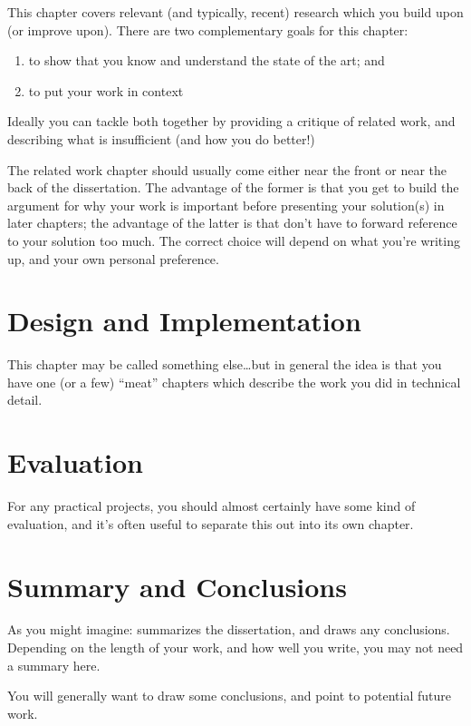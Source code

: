 \documentclass[a4paper,12pt,twoside,openright]{report}
\begin{document}
This chapter covers relevant (and typically, recent) research
which you build upon (or improve upon). There are two complementary
goals for this chapter:
\begin{enumerate}
  \item to show that you know and understand the state of the art; and
  \item to put your work in context
\end{enumerate}

Ideally you can tackle both together by providing a critique of
related work, and describing what is insufficient (and how you do
better!)

The related work chapter should usually come either near the front or
near the back of the dissertation. The advantage of the former is that
you get to build the argument for why your work is important before
presenting your solution(s) in later chapters; the advantage of the
latter is that don't have to forward reference to your solution too
much. The correct choice will depend on what you're writing up, and
your own personal preference.



\chapter{Design and Implementation}

This chapter may be called something else\ldots but in general
the idea is that you have one (or a few) ``meat'' chapters which
describe the work you did in technical detail.


\chapter{Evaluation}

For any practical projects, you should almost certainly have
some kind of evaluation, and it's often useful to separate
this out into its own chapter.


\chapter{Summary and Conclusions}

As you might imagine: summarizes the dissertation, and draws
any conclusions. Depending on the length of your work, and
how well you write, you may not need a summary here.

You will generally want to draw some conclusions, and point
to potential future work. \cite{DirectXWorkings}




\appendix
\singlespacing



\end{document}
